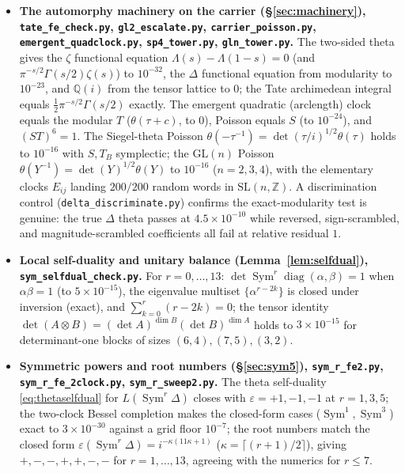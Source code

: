 \documentclass[11pt]{article}
\theoremstyle{definition}
\newcommand{\Sym}{\operatorname{Sym}}
\begin{document}
\begin{itemize}
\item \textbf{The automorphy machinery on the carrier (\S\ref{sec:machinery}),
\texttt{tate\_fe\_check.py}, \texttt{gl2\_escalate.py}, \texttt{carrier\_poisson.py},
\texttt{emergent\_quadclock.py}, \texttt{sp4\_tower.py}, \texttt{gln\_tower.py}.} The two-sided theta
gives the $\zeta$ functional equation $\Lambda(s)-\Lambda(1-s)=0$ (and $\pi^{-s/2}\Gamma(s/2)\zeta(s)$)
to $10^{-32}$, the $\Delta$ functional equation from modularity to $10^{-23}$, and $\mathbb Q(i)$ from
the tensor lattice to $0$; the Tate archimedean integral equals $\tfrac12\pi^{-s/2}\Gamma(s/2)$
exactly. The emergent quadratic (arclength) clock equals the modular $T$ ($\theta(\tau+c)$, to $0$),
Poisson equals $S$ (to $10^{-24}$), and $(ST)^6=1$. The Siegel-theta Poisson $\theta(-\tau^{-1})=
\det(\tau/i)^{1/2}\theta(\tau)$ holds to $10^{-16}$ with $S,T_B$ symplectic; the $\mathrm{GL}(n)$
Poisson $\theta(Y^{-1})=\det(Y)^{1/2}\theta(Y)$ to $10^{-16}$ ($n=2,3,4$), with the elementary clocks
$E_{ij}$ landing $200/200$ random words in $\mathrm{SL}(n,\mathbb Z)$. A discrimination control
(\texttt{delta\_discriminate.py}) confirms the exact-modularity test is genuine: the true $\Delta$
theta passes at $4.5\times10^{-10}$ while reversed, sign-scrambled, and magnitude-scrambled
coefficients all fail at relative residual $1$.

\item \textbf{Local self-duality and unitary balance (Lemma~\ref{lem:selfdual}), \texttt{sym\_selfdual\_check.py}.}
For $r=0,\dots,13$: $\det\Sym^r\operatorname{diag}(\alpha,\beta)=1$ when $\alpha\beta=1$ (to $5\times10^{-15}$),
the eigenvalue multiset $\{\alpha^{r-2k}\}$ is closed under inversion (exact), and $\sum_{k=0}^r(r-2k)=0$;
the tensor identity $\det(A\otimes B)=(\det A)^{\dim B}(\det B)^{\dim A}$ holds to $3\times10^{-15}$ for
determinant-one blocks of sizes $(6,4),(7,5),(3,2)$.

\item \textbf{Symmetric powers and root numbers (\S\ref{sec:sym5}), \texttt{sym\_r\_fe2.py},
\texttt{sym\_r\_fe\_2clock.py}, \texttt{sym\_r\_sweep2.py}.} The theta self-duality
\eqref{eq:thetaselfdual} for $L(\Sym^r\Delta)$ closes with $\varepsilon=+1,-1,-1$ at $r=1,3,5$; the
two-clock Bessel completion makes the closed-form cases ($\Sym^1,\Sym^3$) exact to $3\times10^{-30}$
against a grid floor $10^{-7}$; the root numbers match the closed form
$\varepsilon(\Sym^r\Delta)=i^{-\kappa(11\kappa+1)}$ ($\kappa=\lceil(r{+}1)/2\rceil$), giving
$+,-,-,+,+,-,-$ for $r=1,\dots,13$, agreeing with the numerics for $r\le7$.


\end{itemize}
\end{document}
